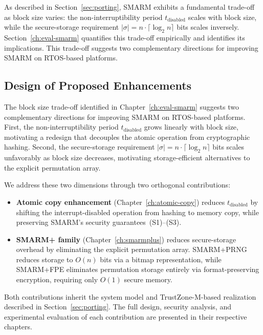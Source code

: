\documentclass[a4paper,10pt]{article}
\begin{document}
{As described in Section~\ref{sec:porting}, SMARM exhibits a fundamental trade-off as block size varies: the non-interruptibility period
$t_{\text{disabled}}$ scales with block size, while the secure-storage
requirement $|\sigma| = n \cdot \lceil \log_2 n \rceil$ bits scales
inversely. Section~\ref{ch:eval-smarm} quantifies this trade-off
empirically and identifies its implications. This trade-off suggests two
complementary directions for improving SMARM on RTOS-based platforms.


\subsection{Design of Proposed Enhancements}
\label{sec:proposed-enhancements}

The block size trade-off identified in Chapter~\ref{ch:eval-smarm}
suggests two complementary directions for improving SMARM on RTOS-based
platforms. First, the non-interruptibility period $t_{\text{disabled}}$
grows linearly with block size, motivating a redesign that decouples the
atomic operation from cryptographic hashing. Second, the secure-storage
requirement $|\sigma| = n \cdot \lceil \log_2 n \rceil$ bits scales
unfavorably as block size decreases, motivating storage-efficient
alternatives to the explicit permutation array.

We address these two dimensions through two orthogonal contributions:

\begin{itemize}
    \item \textbf{Atomic copy enhancement} (Chapter~\ref{ch:atomic-copy})
    reduces $t_{\text{disabled}}$ by shifting the interrupt-disabled
    operation from hashing to memory copy, while preserving SMARM's
    security guarantees~(S1)--(S3).

    \item \textbf{SMARM+ family} (Chapter~\ref{ch:smarmplus}) reduces
    secure-storage overhead by eliminating the explicit permutation
    array. SMARM+PRNG reduces storage to $O(n)$ bits via
    a bitmap representation, while SMARM+FPE eliminates
    permutation storage entirely via format-preserving encryption,
    requiring only $O(1)$ secure memory.
\end{itemize}

Both contributions inherit the system model and TrustZone-M-based
realization described in Section~\ref{sec:porting}. The full design,
security analysis, and experimental evaluation of each contribution are
presented in their respective chapters.



}
\end{document}
